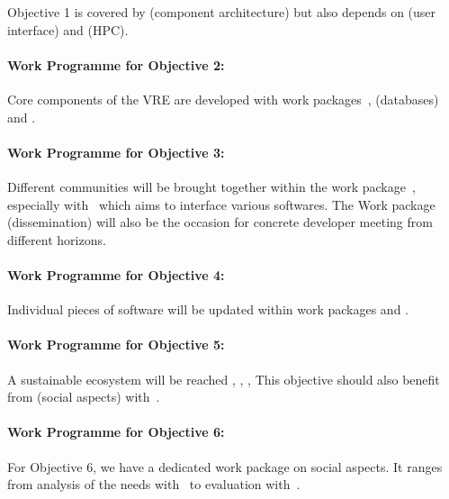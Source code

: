 \documentclass[noworkareas,deliverables,\classoptions]{euproposal}       %
\begin{document}
\begin{proposal}
Objective 1 is covered by  (component architecture) but also depends
on  (user interface) and  (HPC).

\paragraph{Work Programme for Objective 2: }

Core components of the VRE are developed with work packages~,
  (databases) and .

\paragraph{Work Programme for Objective 3: }

Different communities will be brought together within the work package~,
especially with~ which aims to interface
various softwares. The Work package~ (dissemination) will also be the occasion
for concrete developer meeting from different horizons.

\paragraph{Work Programme for Objective 4: }

Individual pieces of software will be updated within work packages  and .

\paragraph{Work Programme for Objective 5: }

A sustainable ecosystem will be reached
, , ,  
This objective should also benefit from  (social aspects) with~.

\paragraph{Work Programme for Objective 6: }

For Objective 6, we have a dedicated work package  on social aspects.
It ranges from analysis of the needs with~ to
evaluation with~.


\end{proposal}
\end{document}
